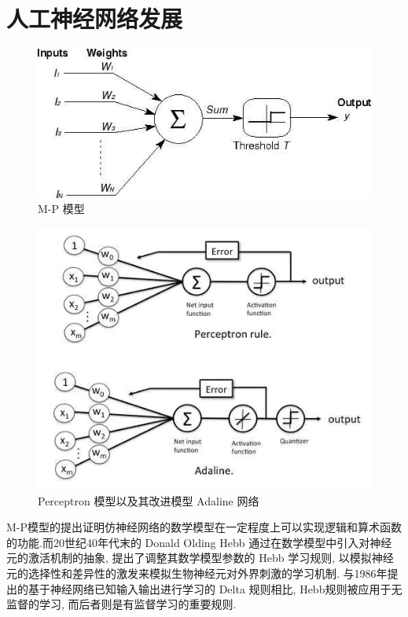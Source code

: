 \section{人工神经网络发展}
\begin{figure}
	\centering
	\includegraphics[scale=0.7]{Figures/mpmodel.png}
	\caption{M-P 模型}
\end{figure}
\begin{figure}
	\centering
	\includegraphics[scale=0.7]{Figures/perceptron.png}
	\caption{Perceptron 模型以及其改进模型 Adaline 网络}
\end{figure}

M-P模型的提出证明仿神经网络的数学模型在一定程度上可以实现逻辑和算术函数的功能.而20世纪40年代末的 Donald Olding Hebb 通过在数学模型中引入对神经元的激活机制的抽象, 提出了调整其数学模型参数的 Hebb 学习规则, 以模拟神经元的选择性和差异性的激发来模拟生物神经元对外界刺激的学习机制. 与1986年提出的基于神经网络已知输入输出进行学习的 Delta 规则相比, Hebb规则被应用于无监督的学习, 而后者则是有监督学习的重要规则.


